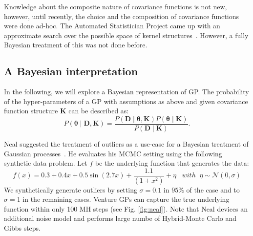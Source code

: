 \documentclass{article} %
\begin{document}
Knowledge about the composite nature of covariance functions is not new, however, until recently, the choice and the composition of covariance functions were done ad-hoc. The Automated Statistician Project came up with an approximate search over the possible space of kernel structures~\citep{duvenaud2013structure,lloyd2014automatic}. However, a fully Bayesian treatment of this was not done before.

\subsection{A Bayesian interpretation}
In the following, we will explore a Bayesian representation of GP. The probability of the hyper-parameters of a GP with assumptions as above and given covariance function structure $\mathbf{K}$ can be described as:
\begin{equation}
\label{eq:hyperProbability}
P(\bm{\theta} \mid \mathbf{D,K}) = \frac{P(\mathbf{D} \mid \bm{\theta}, \mathbf{K})P(\bm{\theta} \mid  \mathbf{K})}{P(\mathbf{D} \mid \mathbf{K})}.
\end{equation}


Neal suggested the treatment of outliers as a use-case for a Bayesian treatment of Gaussian processes~\citeyearpar{neal1997monte}. He evaluates his MCMC setting using the following synthetic data problem. Let $f$ be the underlying function that generates the data:
\begin{equation}
f(x) =  0.3 + 0.4 x + 0.5 \sin(2.7x) + \frac{1.1}{(1+ x^2)} + \eta \;\;\; with\;\;\eta \sim \mathcal{N}(0,\sigma)
\end{equation}
We synthetically generate outliers by setting $\sigma = 0.1$ in $95\%$ of the case and to $\sigma = 1$ in the remaining cases. Venture GPs can capture the true underlying function within only 100 MH steps (see Fig. \ref{fig:neal}). Note that Neal devices an additional noise model and performs large numbe of Hybrid-Monte Carlo and Gibbs steps.  
\end{document}
